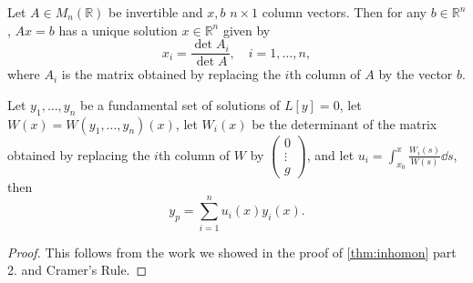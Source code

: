 \begin{theorem}
    Let $A \in M_{n}(\mathbb{R})$ be invertible and $x, b$ $n \times 1$ column vectors. Then for any $b \in \mathbb{R}^n$, $Ax = b$ has a unique solution $x \in \mathbb{R}^n$ given by \[
    x_i = \frac{\det A_i}{\det A}, \quad i = 1, \dots, n,
    \]
    where $A_i$ is the matrix obtained by replacing the $i$th column of $A$ by the vector $b$.
\end{theorem}

\begin{theorem}
    Let $y_1, \dots, y_n$ be a fundamental set of solutions of $L[y] = 0$, let $W(x) = W(y_1, 
    \dots, y_n)(x)$, let $W_i(x)$ be the determinant of the matrix obtained by replacing the $i$th column of $W$ by $\begin{pmatrix}
        0\\
        \vdots\\
        g
    \end{pmatrix}$, and let $u_i = \int_{x_0}^x \frac{W_i(s)}{W(s)} \dd{s}$, then \[
    y_p = \sum_{i=1}^n u_i(x) y_i(x).
    \]
\end{theorem}
\begin{proof}
    This follows from the work we showed in the proof of \cref{thm:inhomon} part 2. and Cramer's Rule.
\end{proof}

